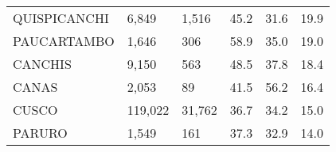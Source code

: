 \begin{tabular}{llllll}
	\cellcolor[HTML]{FF5050}QUISPICANCHI                           & 6,849                                                                 & 1,516                                                            & 45.2                                                                             & 31.6                                                                        & 19.9                                                                                \\
	\cellcolor[HTML]{FF5050}PAUCARTAMBO                            & 1,646                                                                 & 306                                                              & 58.9                                                                             & 35.0                                                                        & 19.0                                                                                \\
	\cellcolor[HTML]{FF5050}CANCHIS                                & 9,150                                                                 & 563                                                              & 48.5                                                                             & 37.8                                                                        & 18.4                                                                                \\
	\cellcolor[HTML]{FF5050}CANAS                                  & 2,053                                                                 & 89                                                               & 41.5                                                                             & 56.2                                                                        & 16.4                                                                                \\
	\cellcolor[HTML]{F8CBAD}CUSCO                                  & 119,022                                                               & 31,762                                                           & 36.7                                                                             & 34.2                                                                        & 15.0                                                                                \\
	\cellcolor[HTML]{F8CBAD}PARURO                                 & 1,549                                                                 & 161                                                              & 37.3                                                                             & 32.9                                                                        & 14.0                                                                                \\

\end{tabular}

